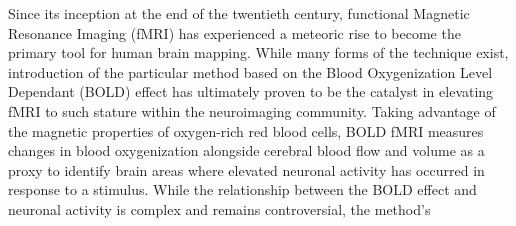 Since its inception at the end of the twentieth century, functional Magnetic Resonance Imaging (fMRI) has experienced a meteoric rise to become the primary tool for human brain mapping. While many forms of the technique exist, introduction of the particular method based on the Blood Oxygenization Level Dependant (BOLD) effect has ultimately proven to be the catalyst in elevating fMRI to such stature within the neuroimaging community. Taking advantage of the magnetic properties of oxygen-rich red blood cells, BOLD fMRI measures changes in blood oxygenization alongside cerebral blood flow and volume as a proxy to identify brain areas where elevated neuronal activity has occurred in response to a stimulus. While the relationship between the BOLD effect and neuronal activity is complex and remains controversial, the method's    